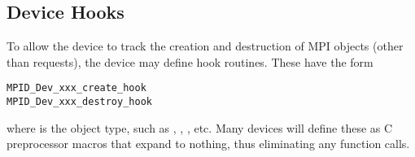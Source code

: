 \subsection{Device Hooks}
To allow the device to track the creation and destruction of MPI
objects (other than requests), the device may define hook routines.
These have the form
\begin{verbatim}
MPID_Dev_xxx_create_hook
MPID_Dev_xxx_destroy_hook
\end{verbatim}
where  is the object type, such as ,
, , etc.  Many devices will define these as
C preprocessor macros that expand to nothing, thus eliminating any
function calls.
